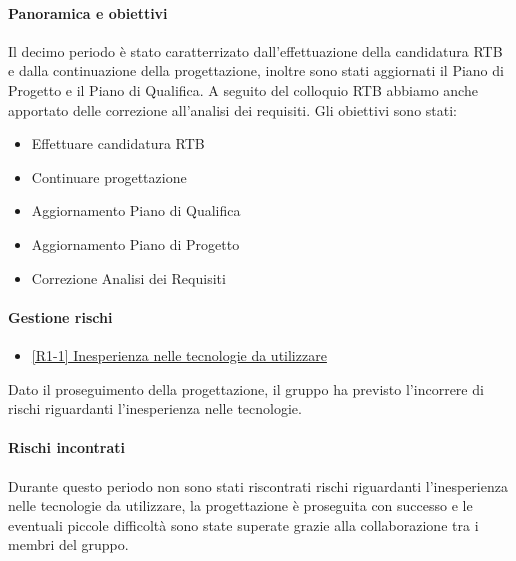 \documentclass[a4paper,12pt]{article}
\begin{document}
            \paragraph{Panoramica e obiettivi}
            Il decimo periodo è stato caratterrizato dall'effettuazione della candidatura RTB e dalla continuazione della progettazione, inoltre sono stati aggiornati il Piano di Progetto e il Piano di Qualifica. A seguito del colloquio RTB abbiamo anche apportato delle correzione all'analisi dei requisiti. Gli obiettivi sono stati:
            \begin{itemize}
                \item Effettuare candidatura RTB
                \item Continuare progettazione
                \item Aggiornamento Piano di Qualifica
                \item Aggiornamento Piano di Progetto
                \item Correzione Analisi dei Requisiti
            \end{itemize}
            
            \paragraph{Gestione rischi}
                \begin{itemize}
                \item\hyperref[tab:r1]{[R1-1] Inesperienza nelle tecnologie da utilizzare}
                \end{itemize}
                Dato il proseguimento della progettazione, il gruppo ha previsto l'incorrere di rischi riguardanti l'inesperienza nelle tecnologie.
    
                \paragraph*{Rischi incontrati}
                Durante questo periodo non sono stati riscontrati rischi riguardanti l'inesperienza nelle tecnologie da utilizzare, la progettazione è proseguita con successo e le eventuali piccole difficoltà sono state superate grazie alla collaborazione tra i membri del gruppo.
\end{document}
